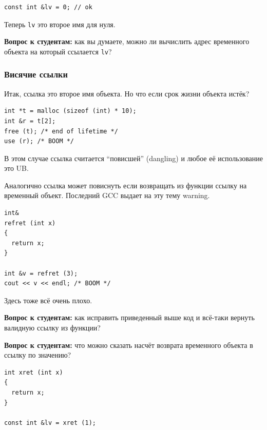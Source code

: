 \documentclass[a4paper,12pt,oneside]{article}
\newif\ifanswers
\begin{document}
\begin{lstlisting}
const int &lv = 0; // ok
\end{lstlisting}

Теперь \lstinline!lv! это второе имя для нуля.

\textbf{Вопрос к студентам:} как вы думаете, можно ли вычислить адрес временного объекта на который ссылается \lstinline!lv!?

\ifanswers
Ответ: увы нет и, более того, сам этот объект не обязан существовать.
\fi

\subsubsection{Висячие ссылки}\label{DanglingRefs}

Итак, ссылка это второе имя объекта. Но что если срок жизни объекта истёк?

\begin{lstlisting}
int *t = malloc (sizeof (int) * 10);
int &r = t[2];
free (t); /* end of lifetime */
use (r); /* BOOM */ 
\end{lstlisting}

В этом случае ссылка считается ``повисшей'' (dangling) и любое её использование это UB.

Аналогично ссылка может повиснуть если возвращать из функции ссылку на временный объект. Последний GCC выдает на эту тему warning.

\begin{lstlisting}
int& 
refret (int x)
{
  return x;
}

int &v = refret (3);
cout << v << endl; /* BOOM */
\end{lstlisting}

Здесь тоже всё очень плохо.

\textbf{Вопрос к студентам:} как исправить приведенный выше код и всё-таки вернуть валидную ссылку из функции?

\ifanswers
Ответов может быть много: статические переменные, динамическая аллокация, глобалы, выберите ваш вариант
\fi

\textbf{Вопрос к студентам:} что можно сказать насчёт возврата временного объекта в ссылку по значению?

\begin{lstlisting}
int xret (int x)
{
  return x;
}

const int &lv = xret (1);
\end{lstlisting}

\ifanswers
Правильный ответ: тут всё нормально, работает обсуждавшееся выше расширение срока жизни.
\fi
\end{document}
